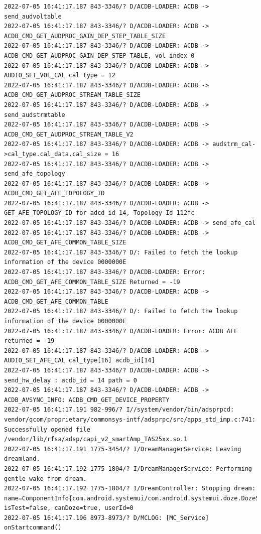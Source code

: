 \documentclass[a4paper,12pt]{book}
\begin{document}
\begin{lstlisting}
2022-07-05 16:41:17.187 843-3346/? D/ACDB-LOADER: ACDB -> send_audvoltable
2022-07-05 16:41:17.187 843-3346/? D/ACDB-LOADER: ACDB -> ACDB_CMD_GET_AUDPROC_GAIN_DEP_STEP_TABLE_SIZE
2022-07-05 16:41:17.187 843-3346/? D/ACDB-LOADER: ACDB -> ACDB_CMD_GET_AUDPROC_GAIN_DEP_STEP_TABLE, vol index 0
2022-07-05 16:41:17.187 843-3346/? D/ACDB-LOADER: ACDB -> AUDIO_SET_VOL_CAL cal type = 12
2022-07-05 16:41:17.187 843-3346/? D/ACDB-LOADER: ACDB -> ACDB_CMD_GET_AUDPROC_STREAM_TABLE_SIZE
2022-07-05 16:41:17.187 843-3346/? D/ACDB-LOADER: ACDB -> send_audstrmtable
2022-07-05 16:41:17.187 843-3346/? D/ACDB-LOADER: ACDB -> ACDB_CMD_GET_AUDPROC_STREAM_TABLE_V2
2022-07-05 16:41:17.187 843-3346/? D/ACDB-LOADER: ACDB -> audstrm_cal->cal_type.cal_data.cal_size = 16
2022-07-05 16:41:17.187 843-3346/? D/ACDB-LOADER: ACDB -> send_afe_topology
2022-07-05 16:41:17.187 843-3346/? D/ACDB-LOADER: ACDB -> ACDB_CMD_GET_AFE_TOPOLOGY_ID
2022-07-05 16:41:17.187 843-3346/? D/ACDB-LOADER: ACDB -> GET_AFE_TOPOLOGY_ID for adcd_id 14, Topology Id 112fc
2022-07-05 16:41:17.187 843-3346/? D/ACDB-LOADER: ACDB -> send_afe_cal
2022-07-05 16:41:17.187 843-3346/? D/ACDB-LOADER: ACDB -> ACDB_CMD_GET_AFE_COMMON_TABLE_SIZE
2022-07-05 16:41:17.187 843-3346/? D/: Failed to fetch the lookup information of the device 0000000E 
2022-07-05 16:41:17.187 843-3346/? D/ACDB-LOADER: Error: ACDB_CMD_GET_AFE_COMMON_TABLE_SIZE Returned = -19
2022-07-05 16:41:17.187 843-3346/? D/ACDB-LOADER: ACDB -> ACDB_CMD_GET_AFE_COMMON_TABLE
2022-07-05 16:41:17.187 843-3346/? D/: Failed to fetch the lookup information of the device 0000000E 
2022-07-05 16:41:17.187 843-3346/? D/ACDB-LOADER: Error: ACDB AFE returned = -19
2022-07-05 16:41:17.187 843-3346/? D/ACDB-LOADER: ACDB -> AUDIO_SET_AFE_CAL cal_type[16] acdb_id[14]
2022-07-05 16:41:17.187 843-3346/? D/ACDB-LOADER: ACDB -> send_hw_delay : acdb_id = 14 path = 0
2022-07-05 16:41:17.187 843-3346/? D/ACDB-LOADER: ACDB -> ACDB_AVSYNC_INFO: ACDB_CMD_GET_DEVICE_PROPERTY
2022-07-05 16:41:17.191 982-996/? I//system/vendor/bin/adsprpcd: vendor/qcom/proprietary/commonsys-intf/adsprpc/src/apps_std_imp.c:741: Successfully opened file /vendor/lib/rfsa/adsp/capi_v2_smartAmp_TAS25xx.so.1
2022-07-05 16:41:17.191 1775-3454/? I/DreamManagerService: Leaving dreamland.
2022-07-05 16:41:17.192 1775-1804/? I/DreamManagerService: Performing gentle wake from dream.
2022-07-05 16:41:17.192 1775-1804/? I/DreamController: Stopping dream: name=ComponentInfo{com.android.systemui/com.android.systemui.doze.DozeService}, isTest=false, canDoze=true, userId=0
2022-07-05 16:41:17.196 8973-8973/? D/MCLOG: [MC_Service] onStartcommand()

\end{lstlisting}
\end{document}
